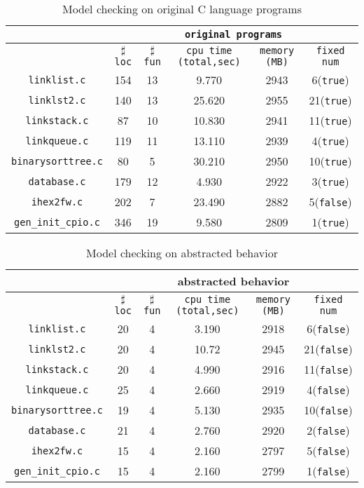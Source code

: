 \begin{table}
\begin{tabular}{|c|c|c|c|c|c|}
\hline
& \multicolumn{5}{|c|}{\texttt{original programs}}  \\
\hline
 & $\sharp$\texttt{loc} & $\sharp$\texttt{fun} & \texttt{cpu time (total,sec)} & \texttt{memory (MB)} & \texttt{fixed num} \\
\hline
\texttt{linklist.c} & 154 & 13 & 9.770 & 2943 & 6(\texttt{true})  \\
\hline
\texttt{linklst2.c} & 140 & 13 & 25.620 & 2955 & 21(\texttt{true}) \\
\hline
\texttt{linkstack.c}  & 87 & 10 & 10.830 & 2941 & 11(\texttt{true}) \\
\hline
\texttt{linkqueue.c} & 119 & 11 & 13.110 & 2939 & 4(\texttt{true}) \\
\hline
\texttt{binarysorttree.c} & 80 & 5 & 30.210 & 2950 & 10(\texttt{true})  \\
\hline
\texttt{database.c} & 179 & 12 & 4.930 & 2922 & 3(\texttt{true}) \\
\hline
\texttt{ihex2fw.c} & 202 & 7 & 23.490 & 2882 & 5(\texttt{false}) \\
\hline
\texttt{gen\_init\_cpio.c} & 346 & 19 & 9.580 & 2809 & 1(\texttt{true}) \\
\hline
\end{tabular}
\caption{Model checking on original C language programs}
\label{tb:mcc}
\end{table}

\begin{table}
\begin{tabular}{|c|c|c|c|c|c|}
\hline
&\multicolumn{5}{|c|}{abstracted behavior} \\
\hline
 &$\sharp$\texttt{loc} & $\sharp$\texttt{fun} & \texttt{cpu time (total,sec)} & \texttt{memory (MB)} & \texttt{fixed num} \\
\hline
\texttt{linklist.c} &  20 & 4 & 3.190 & 2918 & 6(\texttt{false}) \\
\hline
\texttt{linklst2.c} & 20 & 4 & 10.72 & 2945 & 21(\texttt{false}) \\
\hline
\texttt{linkstack.c} & 20 & 4 & 4.990 & 2916 & 11(\texttt{false}) \\
\hline
\texttt{linkqueue.c} & 25 & 4 & 2.660 & 2919 & 4(\texttt{false}) \\
\hline
\texttt{binarysorttree.c} & 19 & 4 & 5.130 & 2935 & 10(\texttt{false}) \\
\hline
\texttt{database.c}  & 21 & 4 & 2.760 & 2920 & 2(\texttt{false}) \\
\hline
\texttt{ihex2fw.c}  & 15 & 4 & 2.160 & 2797 & 5(\texttt{false}) \\
\hline
\texttt{gen\_init\_cpio.c} & 15 & 4 & 2.160 & 2799 & 1(\texttt{false}) \\
\hline
\end{tabular}
\caption{Model checking on abstracted behavior}
\label{tb:mca}
\end{table}


